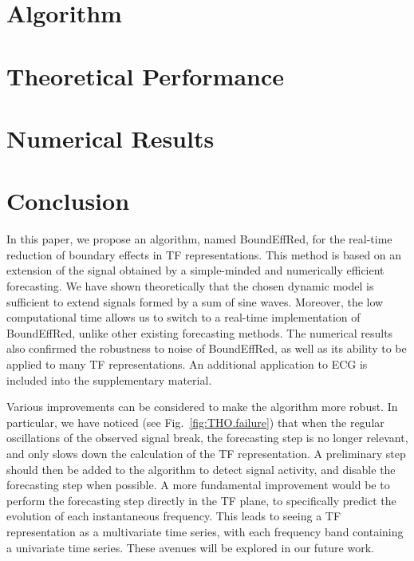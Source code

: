 \documentclass[journal]{IEEEtran}
\begin{document}
\section{Algorithm}
\label{se:algo}



\section{Theoretical Performance}
\label{se:theoretical}


\section{Numerical Results}
\label{se:results}


\section{Conclusion}
\label{se:conclusion}
In this paper, we propose an algorithm, named {\sf BoundEffRed}, for the real-time reduction of boundary effects in TF representations. This method is based on an extension of the signal obtained by a simple-minded and numerically efficient forecasting. We have shown theoretically that the chosen dynamic model is sufficient to extend signals formed by a sum of sine waves. Moreover, the low computational time allows us to switch to a real-time implementation of {\sf BoundEffRed}, unlike other existing forecasting methods. The numerical results also confirmed the robustness to noise of {\sf BoundEffRed}, as well as its ability to be applied to many TF representations. An additional application to ECG is included into the supplementary material.

Various improvements can be considered to make the algorithm more robust. In particular, we have noticed (see Fig.~\ref{fig:THO.failure}) that when the regular oscillations of the observed signal break, the forecasting step is no longer relevant, and only slows down the calculation of the TF representation. A preliminary step should then be added to the algorithm to detect signal activity, and disable the forecasting step when possible. A more fundamental improvement would be to perform the forecasting step directly in the TF plane, to specifically predict the evolution of each instantaneous frequency. This leads to seeing a TF representation as a multivariate time series, with each frequency band containing a univariate time series. These avenues will be explored in our future work.

%





%
\end{document}
